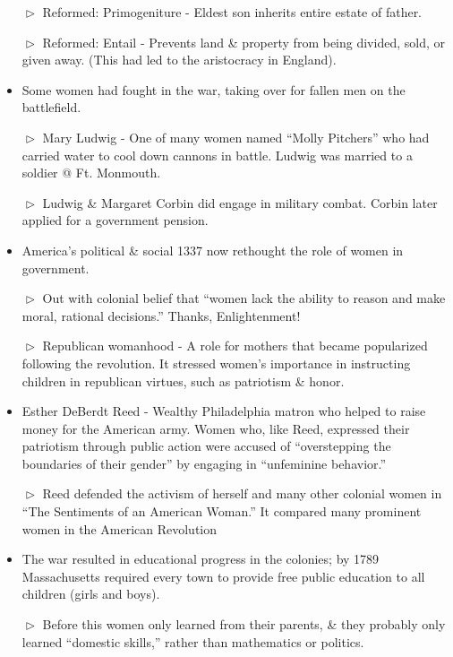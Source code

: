 \documentclass[10pt]{article}
\begin{document}
\begin{flushleft}
\begin{multicols}{2}
\begin{itemize}
\item[$\vartriangleright$] Reformed: Primogeniture - Eldest son inherits entire estate of father.
\item[$\vartriangleright$] Reformed: Entail - Prevents land \& property from being divided, sold, or given away. (This had led to the aristocracy in England).
\item Some women had fought in the war, taking over for fallen men on the battlefield.
\item[$\vartriangleright$] Mary Ludwig - One of many women named ``Molly Pitchers'' who had carried water to cool down cannons in battle. Ludwig was married to a soldier @ Ft. Monmouth.
\item[$\vartriangleright$] Ludwig \& Margaret Corbin did engage in military combat. Corbin later applied for a government pension.
\item America's political \& social 1337 now rethought the role of women in government.
\item[$\vartriangleright$] Out with colonial belief that ``women lack the ability to reason and make moral, rational decisions.'' Thanks, Enlightenment!
\item[$\vartriangleright$] Republican womanhood - A role for mothers that became popularized following the revolution. It stressed women's importance in instructing children in republican virtues, such as patriotism \& honor.
\item Esther DeBerdt Reed - Wealthy Philadelphia matron who helped to raise money for the American army. Women who, like Reed, expressed their patriotism through public action were accused of ``overstepping the boundaries of their gender'' by engaging in ``unfeminine behavior.''
\item[$\vartriangleright$] Reed defended the activism of herself and many other colonial women in ``The Sentiments of an American Woman.'' It compared many prominent women in the American Revolution 
\item The war resulted in educational progress in the colonies; by 1789 Massachusetts required every town to provide free public education to all children (girls and boys).
\item[$\vartriangleright$] Before this women only learned from their parents, \& they probably only learned ``domestic skills,'' rather than mathematics or politics.
\end{itemize}

\end{multicols}

\end{flushleft}
\end{document}
